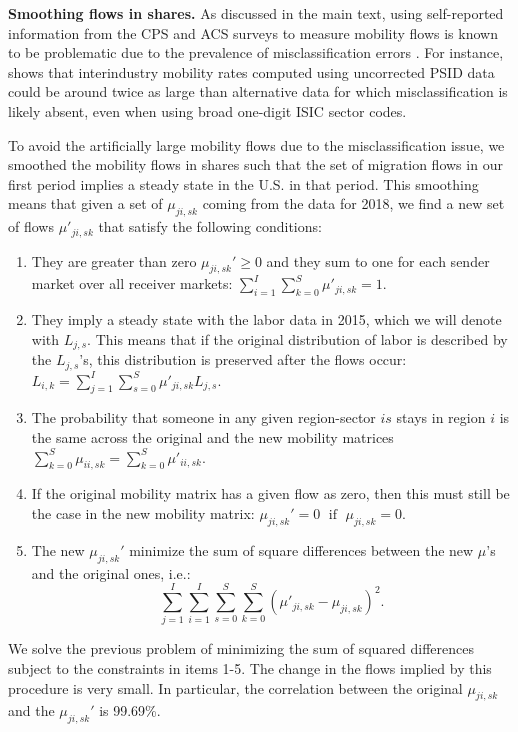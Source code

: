\documentclass[12pt]{article}
\newcommand{\be}{\small \begin{enumerate}}
\newcommand{\ee}{\end{enumerate}}
\begin{document}
\textbf{Smoothing flows in shares.} As discussed in the main text, using self-reported information from the CPS and ACS surveys to measure mobility flows is known to be problematic due to the prevalence of misclassification errors \citep{murphy1987unemployment,kambourov2008rising,kambourov2013cautionary,Dvorkin2021}. For instance, \cite{Dvorkin2021} shows that interindustry mobility rates computed using uncorrected PSID data could be around twice as large than alternative data for which misclassification is likely absent, even when using broad one-digit ISIC sector codes.  

To avoid the artificially large mobility flows due to the misclassification issue, we smoothed the mobility flows in shares such that the set of migration flows in our first period implies a steady state in the U.S. in that period. This smoothing means that given a set of $\mu_{ji,sk}$ coming from the data for 2018, we find a new set of flows $\mu'_{ji,sk}$ that satisfy the following conditions: 
\be
\item They are greater than zero $ \mu_{ji,sk}' \geq 0$ and they sum to one for each sender market over all receiver markets: $\sum_{i=1}^I \sum_{k=0}^S \mu'_{ji,sk} = 1$.
\item They imply a steady state with the labor data in 2015, which we will denote with $L_{j,s}$. This means that if the original distribution of labor is described by the $L_{j,s}$'s, this distribution is preserved after the flows occur: $L_{i,k}= \sum_{j=1}^I \sum_{s=0}^S \mu'_{ji,sk} L_{j,s}$.
\item The probability that someone in any given region-sector $is$ stays in region $i$ is the same across the original and the new mobility matrices $ \sum_{k=0}^S \mu_{ii,sk} = \sum_{k=0}^S \mu'_{ii,sk} $.
\item If the original mobility matrix has a given flow as zero, then this must still be the case in the new mobility matrix: $ \mu_{ji,sk}'=0 \; \text{ if } \; \mu_{ji,sk}=0 $.
\item The new $\mu_{ji,sk}'$ minimize the sum of square differences between the new $\mu$'s and the original ones, i.e.:
$$\sum_{j=1}^{I} \sum_{i=1}^{I} \sum_{s=0}^{S} \sum_{k=0}^{S} (\mu'_{ji,sk}-\mu_{ji,sk})^2.$$
\ee
We solve the previous problem of minimizing the sum of squared differences subject to the constraints in items 1-5. The change in the flows implied by this procedure is very small. In particular, the correlation between the original $\mu_{ji,sk}$ and the $\mu_{ji,sk}'$ is 99.69\%.
\end{document}

